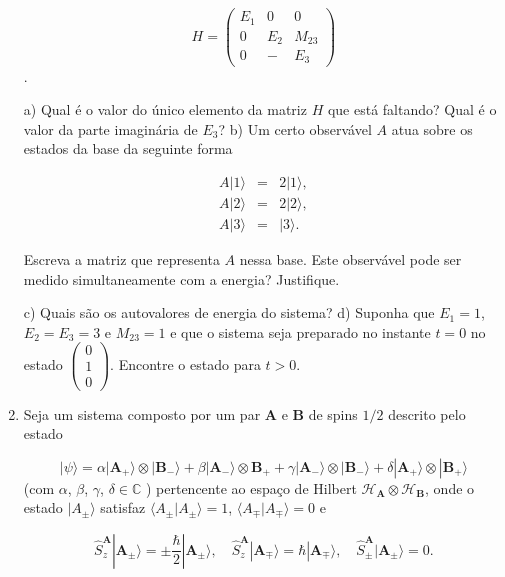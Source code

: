 \begin{enumerate}[start=1,label={\bfseries Q\arabic*.}]
\[ H = \left( \begin{array}{ccc}
E_{1} & 0 & 0 \\
0 & E_{2} & M_{23} \\
0 & - & E_{3} \end{array} \right)\].


a) Qual é o valor do único elemento da matriz $H$ que está faltando? Qual é o valor da parte imaginária de $E_{3}$?
b) Um certo observável $A$ atua sobre os estados da base da seguinte forma

\begin{eqnarray*}
  A|1\rangle &=& 2 |1\rangle,\\
  A|2\rangle &=& 2 |2\rangle, \\
  A|3\rangle &=&   |3\rangle.
\end{eqnarray*}

Escreva a matriz que representa $A$ nessa base. Este observável pode ser medido simultaneamente com a energia? Justifique.

c) Quais são os autovalores de energia do sistema?
d) Suponha que $E_{1} = 1$, $E_{2} = E_{3} = 3$ e $M_{23} = 1$ e que o sistema seja preparado no instante $t = 0$ no estado $ \left( \begin{array}{ccc} 0 \\ 1 \\ 0  \end{array} \right) $. Encontre o estado para $t > 0$.





\item Seja um sistema composto por um par $\mathbf{A}$ e $\mathbf{B}$ de spins $1/2$ descrito pelo estado

$$
|\psi \rangle = \alpha |\mathbf{A}_{+} \rangle  \otimes | \mathbf{B}_{-} \rangle + \beta  |\mathbf{A}_{-} \rangle  \otimes \mathbf{B}_{+} + \gamma |\mathbf{A}_{-} \rangle \otimes | \mathbf{B}_{-} \rangle + \delta |\mathbf{A}_{+} \rangle \otimes |\mathbf{B}_{+} \rangle
$$
(com $\alpha$, $\beta$, $\gamma$, $\delta \in \mathbb{C}$ ) pertencente ao espaço de Hilbert $\mathbf{\mathcal{H}_{A}} \otimes \mathbf{\mathcal{H}_{B}}$, onde o estado $|A_{\pm} \rangle$ satisfaz  $\langle A_{\pm} | A_{\pm} \rangle = 1$, $\langle A_{\mp} | A_{\mp} \rangle = 0$ e

$$
\hat{S}_{z}^{\mathbf{A}} | \mathbf{A}_{\pm} \rangle = \pm \frac{\hbar}{2} | \mathbf{A}_{\pm} \rangle, \quad
\hat{S}_{z}^{\mathbf{A}} | \mathbf{A}_{\mp} \rangle = \hbar | \mathbf{A}_{\mp} \rangle, \quad
\hat{S}_{\pm}^{\mathbf{A}} | \mathbf{A}_{\pm} \rangle = 0.
$$


\end{enumerate}

